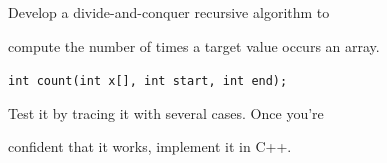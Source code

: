 Develop a divide-and-conquer recursive algorithm to

compute the number of times a target value occurs an array.



\verb!int count(int x[], int start, int end);!



Test it by tracing it with several cases. Once you're

confident that it works, implement it in C++.

